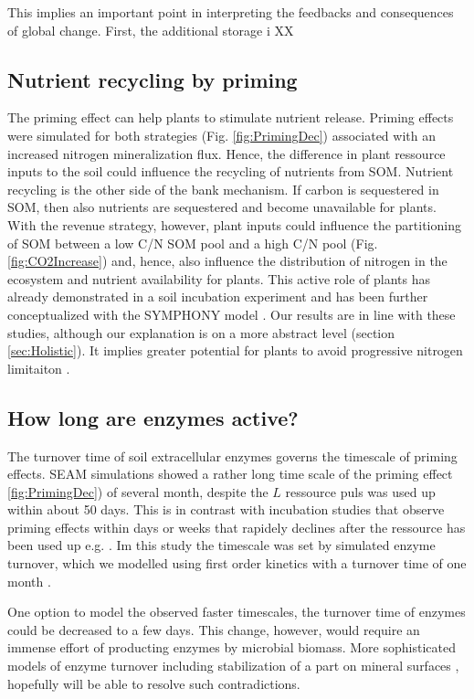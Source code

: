 This implies an important point in interpreting the feedbacks and consequences
of global change.  First, the additional storage i XX

\subsection{Nutrient recycling by priming}
The priming effect can help plants to stimulate nutrient release.
Priming effects were simulated for both strategies (Fig. \ref{fig:PrimingDec})
associated with an increased nitrogen mineralization flux.
Hence, the difference in plant ressource inputs to the soil could influence the
recycling of nutrients from SOM.
Nutrient recycling is the other side of the bank mechanism. If carbon is
sequestered in SOM, then also nutrients are sequestered and become unavailable
for plants.
With the revenue strategy, however, plant inputs could influence the
partitioning of SOM between a low C/N SOM pool and a high C/N pool (Fig.
\ref{fig:CO2Increase}) and, hence, also influence the distribution of nitrogen
in the ecosystem and nutrient availability for plants. This active role of
plants has already demonstrated in a soil incubation experiment
\citep{Fontaine11} and has been further conceptualized with the SYMPHONY model
\citep{Perveen14}. Our results are in line with these studies, although our
explanation is on a more abstract level (section \ref{sec:Holistic}). It implies
greater potential for plants to avoid progressive nitrogen limitaiton
\citep{Norby10, Franklin14, Averill15}.

\subsection{How long are enzymes active?}
The turnover time of soil extracellular enzymes governs the timescale of priming
effects. SEAM simulations showed a rather long time scale of the priming effect
\ref{fig:PrimingDec}) of several month, despite the $L$ ressource puls was used
up within about 50 days. This is in contrast with incubation studies that
observe priming effects within days or weeks that rapidely declines after the
ressource has been used up e.g. \citep{Blagodatskaya14}.
Im this study the timescale was set by simulated enzyme turnover,
which we modelled using first order kinetics with a turnover time of one month
\citep{Burns13}.

One option to model the observed faster timescales, the turnover time of enzymes
could be decreased to a few days.
This change, however, would require an immense effort of producting enzymes by
microbial biomass. More sophisticated models of enzyme turnover
including stabilization of a part on mineral surfaces \citep{Burns13},
hopefully will be able to resolve such contradictions.

